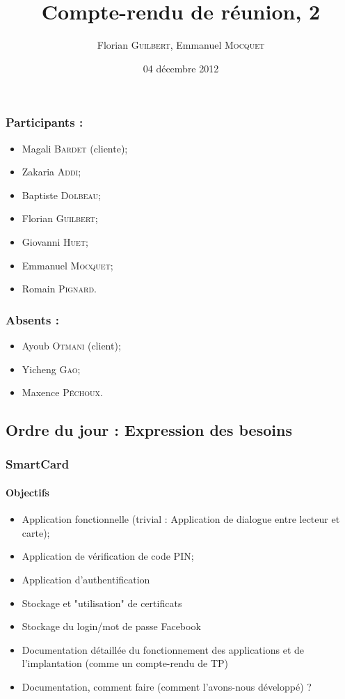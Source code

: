 \documentclass[a4paper,10pt]{article}
\author{Florian \textsc{Guilbert}, Emmanuel \textsc{Mocquet}}
\title{Compte-rendu de réunion, 2}
\date{04 décembre 2012}
\begin{document}
\maketitle

\subsubsection*{Participants : }
\begin{itemize}
    \item Magali \textsc{Bardet} (cliente);
    \item Zakaria \textsc{Addi};
    \item Baptiste \textsc{Dolbeau};
    \item Florian \textsc{Guilbert};
    \item Giovanni \textsc{Huet};
    \item Emmanuel \textsc{Mocquet};
    \item Romain \textsc{Pignard}.
\end{itemize}

\subsubsection*{Absents : }
\begin{itemize}
    \item Ayoub \textsc{Otmani} (client);
    \item Yicheng \textsc{Gao};
    \item Maxence  \textsc{Péchoux}.
\end{itemize}

\subsection*{Ordre du jour : Expression des besoins}

\subsubsection*{SmartCard}

\paragraph{Objectifs} 
\begin{itemize}
    \item Application fonctionnelle (trivial : Application de dialogue entre 
            lecteur et carte);
    \item Application de vérification de code PIN;
    \item Application d'authentification
    \item Stockage et "utilisation" de certificats
    \item Stockage du login/mot de passe Facebook
    \item Documentation détaillée du fonctionnement des applications et 
        de l'implantation (comme un compte-rendu de TP)
    \item Documentation, comment faire (comment l'avons-nous développé) ?
\end{itemize}
         
\end{document}
